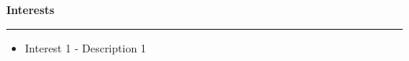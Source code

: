 

\textbf{Interests}

\par\noindent\rule{\textwidth}{0.2pt}

\begin{itemize}
    \item {{Interest 1} - { Description 1}}
\end{itemize}
